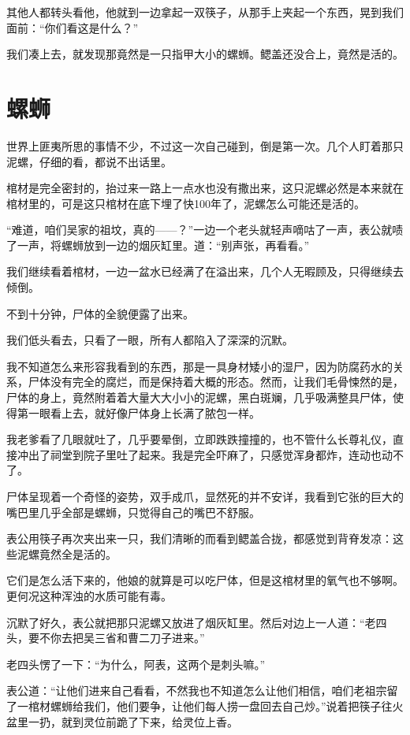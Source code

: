 其他人都转头看他，他就到一边拿起一双筷子，从那手上夹起一个东西，晃到我们面前：“你们看这是什么？”

我们凑上去，就发现那竟然是一只指甲大小的螺蛳。鳃盖还没合上，竟然是活的。

\chapter{螺蛳}

世界上匪夷所思的事情不少，不过这一次自己碰到，倒是第一次。几个人盯着那只泥螺，仔细的看，都说不出话里。

棺材是完全密封的，抬过来一路上一点水也没有撒出来，这只泥螺必然是本来就在棺材里的，可是这只棺材在底下埋了快100年了，泥螺怎么可能还是活的。

“难道，咱们吴家的祖坟，真的——？”一边一个老头就轻声嘀咕了一声，表公就啧了一声，将螺蛳放到一边的烟灰缸里。道：“别声张，再看看。”

我们继续看着棺材，一边一盆水已经满了在溢出来，几个人无暇顾及，只得继续去倾倒。

不到十分钟，尸体的全貌便露了出来。

我们低头看去，只看了一眼，所有人都陷入了深深的沉默。

我不知道怎么来形容我看到的东西，那是一具身材矮小的湿尸，因为防腐药水的关系，尸体没有完全的腐烂，而是保持着大概的形态。然而，让我们毛骨悚然的是，尸体的身上，竟然附着着大量大大小小的泥螺，黑白斑斓，几乎吸满整具尸体，使得第一眼看上去，就好像尸体身上长满了脓包一样。

我老爹看了几眼就吐了，几乎要晕倒，立即跌跌撞撞的，也不管什么长尊礼仪，直接冲出了祠堂到院子里吐了起来。我是完全吓麻了，只感觉浑身都炸，连动也动不了。

尸体呈现着一个奇怪的姿势，双手成爪，显然死的并不安详，我看到它张的巨大的嘴巴里几乎全部是螺蛳，只觉得自己的嘴巴不舒服。

表公用筷子再次夹出来一只，我们清晰的而看到鳃盖合拢，都感觉到背脊发凉：这些泥螺竟然全是活的。

它们是怎么活下来的，他娘的就算是可以吃尸体，但是这棺材里的氧气也不够啊。更何况这种浑浊的水质可能有毒。

沉默了好久，表公就把那只泥螺又放进了烟灰缸里。然后对边上一人道：“老四头，要不你去把吴三省和曹二刀子进来。”

老四头愣了一下：“为什么，阿表，这两个是刺头嘛。”

表公道：“让他们进来自己看看，不然我也不知道怎么让他们相信，咱们老祖宗留了一棺材螺蛳给我们，他们要争，让他们每人捞一盘回去自己炒。”说着把筷子往火盆里一扔，就到灵位前跪了下来，给灵位上香。

